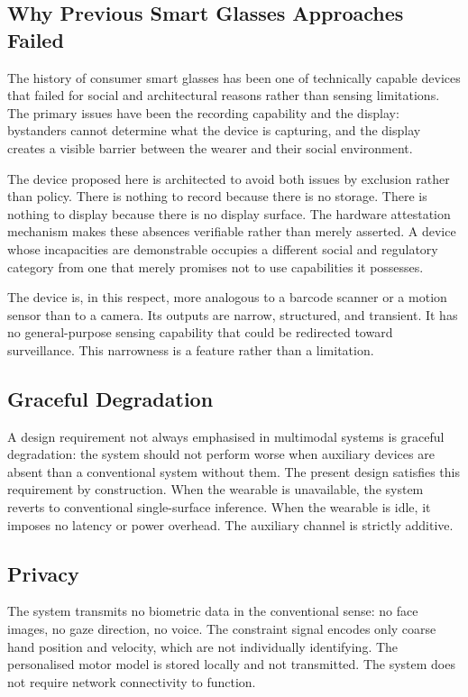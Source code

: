 \documentclass[11pt,letterpaper]{article}
\begin{document}
\subsection{Why Previous Smart Glasses Approaches Failed}

The history of consumer smart glasses has been one of technically capable devices
that failed for social and architectural reasons rather than sensing limitations.
The primary issues have been the recording capability and the display: bystanders
cannot determine what the device is capturing, and the display creates a visible
barrier between the wearer and their social environment.

The device proposed here is architected to avoid both issues by exclusion rather
than policy. There is nothing to record because there is no storage. There is
nothing to display because there is no display surface. The hardware attestation
mechanism makes these absences verifiable rather than merely asserted. A device
whose incapacities are demonstrable occupies a different social and regulatory
category from one that merely promises not to use capabilities it possesses.

The device is, in this respect, more analogous to a barcode scanner or a motion
sensor than to a camera. Its outputs are narrow, structured, and transient. It has
no general-purpose sensing capability that could be redirected toward surveillance.
This narrowness is a feature rather than a limitation.

\subsection{Graceful Degradation}

A design requirement not always emphasised in multimodal systems is graceful
degradation: the system should not perform worse when auxiliary devices are absent
than a conventional system without them. The present design satisfies this
requirement by construction. When the wearable is unavailable, the system reverts
to conventional single-surface inference. When the wearable is idle, it imposes
no latency or power overhead. The auxiliary channel is strictly additive.

\subsection{Privacy}

The system transmits no biometric data in the conventional sense: no face images,
no gaze direction, no voice. The constraint signal encodes only coarse hand position
and velocity, which are not individually identifying. The personalised motor model
is stored locally and not transmitted. The system does not require network
connectivity to function.
\end{document}
